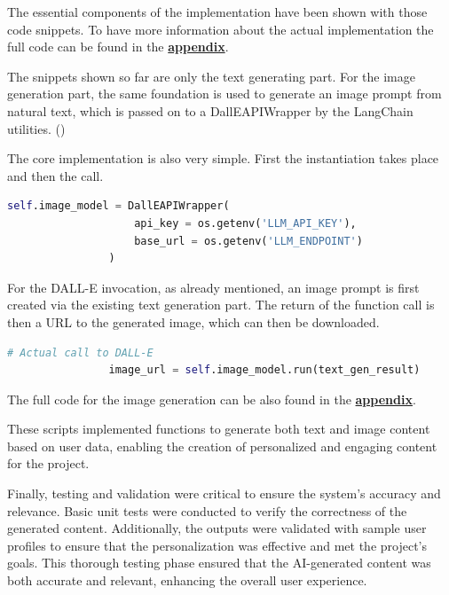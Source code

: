 \documentclass[%
pdftex,
oneside,			%
11pt,				%
parskip=half,		%
headheight = 12pt,	%
headsepline,		%
footsepline,		%
footheight = 16pt,	%
abstracton,		%
DIV=calc,		%
BCOR=8mm,		%
headinclude=false,	%
footinclude=false,	%
listof=totoc,		%
toc=bibliography,	%
]{scrreprt}	%
\begin{document}
            The essential components of the implementation have been shown with those code snippets.
            To have more information about the actual implementation the full code can be found in the \textbf{\hyperref[sec:appendix:text-gen]{appendix}}.

            The snippets shown so far are only the text generating part.
            For the image generation part, the same foundation is used to generate an image prompt from natural text, which is passed on to a DallEAPIWrapper by the LangChain utilities.
            (\cite[Vgl.][]{langchain_dalle_wrapper})

            The core implementation is also very simple.
            First the instantiation takes place and then the call.

            \begin{lstlisting}[language=Python, gobble=12, caption=Instantiating DALL-E with LangChain, firstnumber=19] 
                self.image_model = DallEAPIWrapper(
                    api_key = os.getenv('LLM_API_KEY'),
                    base_url = os.getenv('LLM_ENDPOINT')
                )
            \end{lstlisting}

            For the DALL-E invocation, as already mentioned, an image prompt is first created via the existing text generation part.
            The return of the function call is then a URL to the generated image, which can then be downloaded.

            \begin{lstlisting}[language=Python, gobble=12, caption=Invoking DALL-E with LangChain, firstnumber=60] 
                # Actual call to DALL-E
                image_url = self.image_model.run(text_gen_result)
            \end{lstlisting}

            The full code for the image generation can be also found in the \textbf{\hyperref[sec:appendix:image-gen]{appendix}}.

            These scripts implemented functions to generate both text and image content based on user data, enabling the creation of personalized and engaging content for the project.
            
            Finally, testing and validation were critical to ensure the system's accuracy and relevance. 
            Basic unit tests were conducted to verify the correctness of the generated content. 
            Additionally, the outputs were validated with sample user profiles to ensure that the personalization was effective and met the project's goals. 
            This thorough testing phase ensured that the AI-generated content was both accurate and relevant, enhancing the overall user experience.
\end{document}
